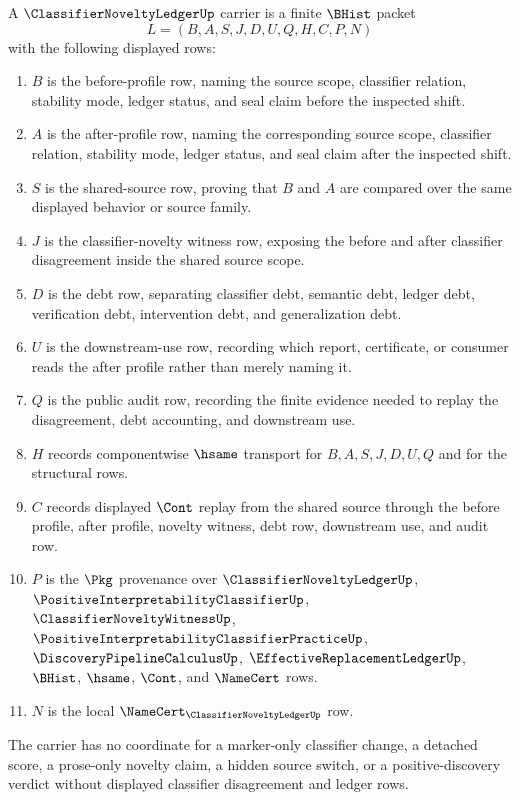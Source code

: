 \begin{definition}
\label{def:classifier-novelty-ledger-carrier}
A $\ClassifierNoveltyLedgerUp$ carrier is a finite $\BHist$ packet
$$
L=(B,A,S,J,D,U,Q,H,C,P,N)
$$
with the following displayed rows:
\begin{enumerate}
\item $B$ is the before-profile row, naming the source scope, classifier relation, stability mode, ledger status, and seal claim before the inspected shift.
\item $A$ is the after-profile row, naming the corresponding source scope, classifier relation, stability mode, ledger status, and seal claim after the inspected shift.
\item $S$ is the shared-source row, proving that $B$ and $A$ are compared over the same displayed behavior or source family.
\item $J$ is the classifier-novelty witness row, exposing the before and after classifier disagreement inside the shared source scope.
\item $D$ is the debt row, separating classifier debt, semantic debt, ledger debt, verification debt, intervention debt, and generalization debt.
\item $U$ is the downstream-use row, recording which report, certificate, or consumer reads the after profile rather than merely naming it.
\item $Q$ is the public audit row, recording the finite evidence needed to replay the disagreement, debt accounting, and downstream use.
\item $H$ records componentwise $\hsame$ transport for $B,A,S,J,D,U,Q$ and for the structural rows.
\item $C$ records displayed $\Cont$ replay from the shared source through the before profile, after profile, novelty witness, debt row, downstream use, and audit row.
\item $P$ is the $\Pkg$ provenance over $\ClassifierNoveltyLedgerUp$, $\PositiveInterpretabilityClassifierUp$, $\ClassifierNoveltyWitnessUp$, $\PositiveInterpretabilityClassifierPracticeUp$, $\DiscoveryPipelineCalculusUp$, $\EffectiveReplacementLedgerUp$, $\BHist$, $\hsame$, $\Cont$, and $\NameCert$ rows.
\item $N$ is the local $\NameCert_{\ClassifierNoveltyLedgerUp}$ row.
\end{enumerate}
The carrier has no coordinate for a marker-only classifier change, a detached score, a prose-only novelty claim, a hidden source switch, or a positive-discovery verdict without displayed classifier disagreement and ledger rows.
\end{definition}

